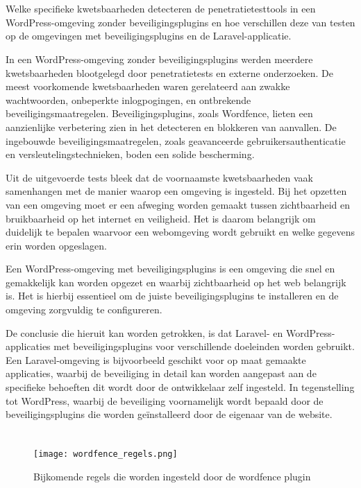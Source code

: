   \section{}  
   Welke specifieke kwetsbaarheden detecteren de penetratietesttools in een WordPress-omgeving zonder beveiligingsplugins en 
   hoe verschillen deze van testen op de omgevingen met beveiligingsplugins en de Laravel-applicatie.
  
  In een WordPress-omgeving zonder beveiligingsplugins werden meerdere kwetsbaarheden blootgelegd door penetratietests en 
  externe onderzoeken. De meest voorkomende kwetsbaarheden waren gerelateerd aan zwakke wachtwoorden, onbeperkte 
  inlogpogingen, en ontbrekende beveiligingsmaatregelen. Beveiligingsplugins, zoals Wordfence, lieten een aanzienlijke 
  verbetering zien in het detecteren en blokkeren van aanvallen. De ingebouwde beveiligingsmaatregelen, zoals geavanceerde 
  gebruikersauthenticatie en versleutelingstechnieken, boden een solide bescherming.

  Uit de uitgevoerde tests bleek dat de voornaamste kwetsbaarheden vaak samenhangen met de manier waarop een omgeving is 
  ingesteld. Bij het opzetten van een omgeving moet er een afweging worden gemaakt tussen zichtbaarheid en bruikbaarheid op het 
  internet en veiligheid. Het is daarom belangrijk om duidelijk te bepalen waarvoor een webomgeving wordt gebruikt en welke 
  gegevens erin worden opgeslagen.

  Een WordPress-omgeving met beveiligingsplugins is een omgeving die snel en gemakkelijk kan worden opgezet en waarbij 
  zichtbaarheid op het web belangrijk is. Het is hierbij essentieel om de juiste beveiligingsplugins te installeren en de 
  omgeving zorgvuldig te configureren.

  De conclusie die hieruit kan worden getrokken, is dat Laravel- en WordPress-applicaties met beveiligingsplugins voor 
  verschillende doeleinden worden gebruikt. Een Laravel-omgeving is bijvoorbeeld geschikt voor op maat gemaakte applicaties, 
  waarbij de beveiliging in detail kan worden aangepast aan de specifieke behoeften dit wordt door de ontwikkelaar zelf 
  ingesteld. In tegenstelling tot WordPress, waarbij de beveiliging voornamelijk wordt bepaald door de beveiligingsplugins 
  die worden geïnstalleerd door de eigenaar van de website.

  \section{}  
  \begin{figure}
    \centering
    \texttt{[image: wordfence\_regels.png]}
    \caption[Bijkomende regels die worden ingesteld door de wordfence plugin]{Bijkomende regels die worden ingesteld door de wordfence plugin}
    \label{fig:wordfence_regels}
  \end{figure}

